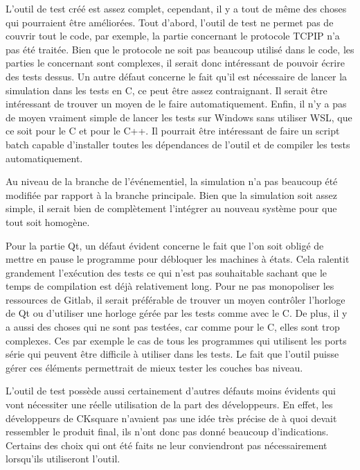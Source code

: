 \documentclass[a4paper]{article}
\begin{document}
L'outil de test créé est assez complet, cependant, il y a tout de même des
choses qui pourraient être améliorées. Tout d'abord, l'outil de test ne permet pas
de couvrir tout le code, par exemple, la partie concernant le protocole TCPIP
n'a pas été traitée. Bien que le protocole ne soit pas beaucoup utilisé dans le
code, les parties le concernant sont complexes, il serait donc intéressant de
pouvoir écrire des tests dessus. Un autre défaut concerne le fait qu'il est
nécessaire de lancer la simulation dans les tests en C, ce peut être assez
contraignant. Il serait être intéressant de trouver un moyen de le faire
automatiquement. Enfin, il n'y a pas de moyen vraiment simple de lancer les
tests sur Windows sans utiliser WSL, que ce soit pour le C et pour le C++. Il
pourrait être intéressant de faire un script batch capable d'installer toutes
les dépendances de l'outil et de compiler les tests automatiquement.

Au niveau de la branche de l'événementiel, la simulation n'a pas beaucoup été
modifiée par rapport à la branche principale. Bien que la simulation soit assez
simple, il serait bien de complètement l'intégrer au nouveau système pour que
tout soit homogène.

Pour la partie Qt, un défaut évident concerne le fait que l'on soit obligé de
mettre en pause le programme pour débloquer les machines à états. Cela ralentit
grandement l'exécution des tests ce qui n'est pas souhaitable sachant que le
temps de compilation est déjà relativement long. Pour ne pas monopoliser les
ressources de Gitlab, il serait préférable de trouver un moyen contrôler
l'horloge de Qt ou d'utiliser une horloge gérée par les tests comme avec le C.
De plus, il y a aussi des choses qui ne sont pas testées, car comme pour le C,
elles sont trop complexes. Ces par exemple le cas de tous les programmes qui
utilisent les ports série qui peuvent être difficile à utiliser dans les tests.
Le fait que l'outil puisse gérer ces éléments permettrait de mieux tester les
couches bas niveau.

L'outil de test possède aussi certainement d'autres défauts moins évidents qui
vont nécessiter une réelle utilisation de la part des développeurs. En effet,
les développeurs de CKsquare n'avaient pas une idée très précise de à quoi
devait ressembler le produit final, ils n'ont donc pas donné beaucoup
d'indications. Certains des choix qui ont été faits ne leur conviendront pas
nécessairement lorsqu'ils utiliseront l'outil.\\
\end{document}
